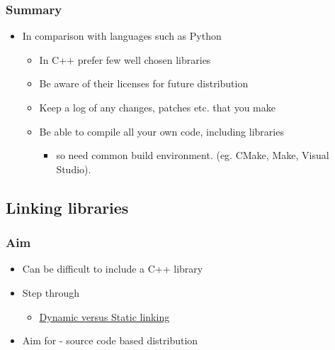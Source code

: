 \subsubsection{Summary}\label{summary-1}

\begin{itemize}
\itemsep1pt\parskip0pt
\item
  In comparison with languages such as Python

  \begin{itemize}
  \itemsep1pt\parskip0pt
  \item
    In C++ prefer few well chosen libraries
  \item
    Be aware of their licenses for future distribution
  \item
    Keep a log of any changes, patches etc. that you make
  \item
    Be able to compile all your own code, including libraries

    \begin{itemize}
    \itemsep1pt\parskip0pt
    \item
      so need common build environment. (eg. CMake, Make, Visual
      Studio).
    \end{itemize}
  \end{itemize}
\end{itemize}

\subsection{Linking libraries}\label{linking-libraries}

\subsubsection{Aim}\label{aim}

\begin{itemize}
\itemsep1pt\parskip0pt
\item
  Can be difficult to include a C++ library
\item
  Step through

  \begin{itemize}
  \itemsep1pt\parskip0pt
  \item
    \href{http://www.learncpp.com/cpp-tutorial/a1-static-and-dynamic-libraries/}{Dynamic
    versus Static linking}
  \end{itemize}
\item
  Aim for - source code based distribution
\end{itemize}

